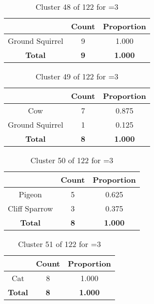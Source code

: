 \begin{table}[ht!]
\centering
\begin{tabular}{|c|c|c|}
\hline
\bf \Spec{} &\bf Count &\bf Proportion\\ \hline \hline
Ground Squirrel & 9 & 1.000\\ \hline
\hline
\bf Total & \bf 9 & \bf 1.000\\ \hline
\end{tabular}
\label{tab:cluster:48:3}
\caption{Cluster 48 of 122 for \minneigh{}=3}
\end{table}

\begin{table}[ht!]
\centering
\begin{tabular}{|c|c|c|}
\hline
\bf \Spec{} &\bf Count &\bf Proportion\\ \hline \hline
Cow & 7 & 0.875\\ \hline
Ground Squirrel & 1 & 0.125\\ \hline
\hline
\bf Total & \bf 8 & \bf 1.000\\ \hline
\end{tabular}
\label{tab:cluster:49:3}
\caption{Cluster 49 of 122 for \minneigh{}=3}
\end{table}

\clearpage
\begin{table}[ht!]
\centering
\begin{tabular}{|c|c|c|}
\hline
\bf \Spec{} &\bf Count &\bf Proportion\\ \hline \hline
Pigeon & 5 & 0.625\\ \hline
Cliff Sparrow & 3 & 0.375\\ \hline
\hline
\bf Total & \bf 8 & \bf 1.000\\ \hline
\end{tabular}
\label{tab:cluster:50:3}
\caption{Cluster 50 of 122 for \minneigh{}=3}
\end{table}

\begin{table}[ht!]
\centering
\begin{tabular}{|c|c|c|}
\hline
\bf \Spec{} &\bf Count &\bf Proportion\\ \hline \hline
Cat & 8 & 1.000\\ \hline
\hline
\bf Total & \bf 8 & \bf 1.000\\ \hline
\end{tabular}
\label{tab:cluster:51:3}
\caption{Cluster 51 of 122 for \minneigh{}=3}
\end{table}

